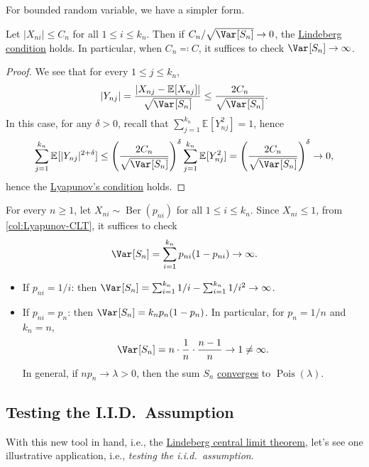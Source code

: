 For bounded random variable, we have a simpler form.

\begin{corollary}\label{col:Lyapunov-CLT}
	Let \(\vert X_{ni} \vert \leq C_n\) for all \(1 \leq i \leq k_n\). Then if \(C_n / \sqrt{\Var_{}[S_n] } \to 0\), the \hyperref[def:Lindeberg-condition]{Lindeberg condition} holds. In particular, when \(C_n \eqqcolon C\), it suffices to check \(\Var_{}[S_n] \to \infty \).
\end{corollary}
\begin{proof}
	We see that for every \(1 \leq j \leq k_n\),
	\[
		\vert Y_{nj} \vert
		= \frac{\vert X_{nj} - \mathbb{E}_{}[X_{nj}] \vert }{\sqrt{\Var_{}[S_n] } }
		\leq \frac{2 C_n}{\sqrt{\Var_{}[S_n] } }.
	\]
	In this case, for any \(\delta > 0\), recall that \(\sum_{j=1}^{k_n} \mathbb{E}_{}[Y_{nj}^2] = 1\), hence
	\[
		\sum_{j=1}^{k_n} \mathbb{E}_{}[\vert Y_{nj} \vert ^{2 + \delta }]
		\leq \left( \frac{2C_n}{\sqrt{\Var_{}[S_n] } } \right) ^\delta \sum_{j=1}^{k_n} \mathbb{E}_{}[Y_{nj}^2]
		= \left( \frac{2C_n}{\sqrt{\Var_{}[S_n] } } \right) ^\delta
		\to 0,
	\]
	hence the \hyperref[thm:Lyapunov-CLT]{Lyapunov's condition} holds.
\end{proof}

\begin{eg}\label{eg:Lyapunov-CLT}
	For every \(n \geq 1\), let \(X_{ni} \sim \operatorname{Ber}(p_{ni}) \) for all \(1 \leq i \leq k_n\). Since \(X_{ni} \leq 1\), from \autoref{col:Lyapunov-CLT}, it suffices to check
	\[
		\Var_{}[S_n]
		= \sum_{i=1}^{k_n} p_{ni} (1 - p_{ni}) \to \infty .
	\]
	\begin{itemize}
		\item If \(p_{ni} = 1 / i\): then \(\Var_{}[S_n] = \sum_{i=1}^{k_n} 1 / i - \sum_{i=1}^{k_n} 1 / i^2 \to \infty \).
		\item If \(p_{ni} = p_n\): then \(\Var_{}[S_n] = k_n p_n (1 - p_n)\). In particular, for \(p_n = 1 / n\) and \(k_n = n\),
		      \[
			      \Var_{}[S_n]
			      = n \cdot \frac{1}{n} \cdot \frac{n-1}{n}
			      \to 1
			      \neq \infty .
		      \]
		      In general, if \(n p_n \to \lambda > 0\), then the sum \(S_n\) \hyperref[def:converge-in-distribution]{converges} to \(\operatorname{Pois}(\lambda ) \).
	\end{itemize}
\end{eg}

\subsection{Testing the I.I.D.\ Assumption}
With this new tool in hand, i.e., the \hyperref[thm:Lindeberg-CLT]{Lindeberg central limit theorem}, let's see one illustrative application, i.e., \emph{testing the i.i.d.\ assumption}.

